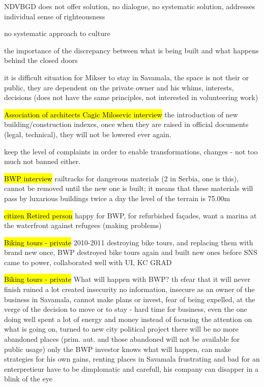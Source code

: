 \documentclass[11pt]{report}
\begin{document}
NDVBGD does not offer solution, no dialogue, no systematic solution, addresses individual sense of righteousness

no systematic approach to culture

the importance of the discrepancy between what is being built and what happens behind the closed doors

it is difficult situation for Mikser to stay in Savamala, the space is not their or public, they are dependent on the private owner and his whims, interests, decisions (does not have the same principles, not interested in volunteering work)

\hl{Association of architects Cagic Milosevic interview}
the introduction of new building/construction indexes, once when they are raised in official documents (legal, technical), they will not be lowered ever again.

keep the level of complaints in order to enable transformations, changes - not too much not banned either.

\hl{BWP interview}
railtracks for dangerous materials (2 in Serbia, one is this), cannot be removed until the new one is built; it means that these materials will pass by luxarious buildings twice a day
the level of the terrain is 75.00m

\hl{citizen Retired person}
happy for BWP, for refurbished façades, want a marina at the waterfront
against refugees (making problems)

\hl{Biking tours - private}
2010-2011 destroying bike tours, and replacing them with brand new once,
BWP destroyed bike tours again and built new ones
before SNS came to power, collaborated well with UI, KC GRAD

\hl{Biking tours - private}
What will happen with BWP?
th efear that it will never finish
ruined a lot
created insecurity
no information, insecure as an owner of the business in Savamala, cannot make plans or invest, fear of being expelled, at the verge of the decision to move or to stay - hard time for business, even the one doing well
spent a lot of energy and money
instead of focusing the attention on what is going on, turned to new city
political project
there will be no more abandoned places (prim. aut. and those abandoned will not be available for public usage)
only the BWP investor knows what will happen, can make strategies for his own gains, renting places in Savamala
frustrating and bad for an enterpretieur
have to be dimplomatic and carefull, his company can disapper in a blink of the eye
\end{document}
